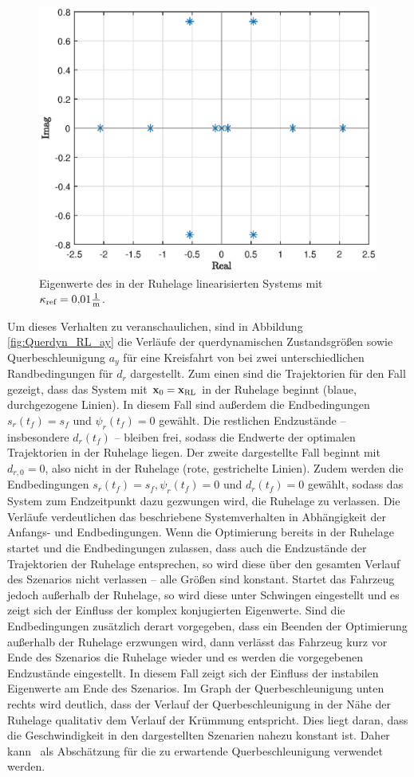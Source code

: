 \begin{figure}[h] 
	\centering
	\includegraphics[width=0.7\linewidth]{./Bilder/Ergebnisse/Kreisfahrt/Mit_Querdynamik/EW_linear_Kreisfahrt.eps}
	\caption{Eigenwerte des in der Ruhelage linearisierten Systems mit $\kappa_{\textrm{ref}} = 0{,}01\frac{1}{\mathrm{m}}$.}
	\label{fig:EW_linear_Kreisfahrt}
\end{figure} 
Um dieses Verhalten zu veranschaulichen, sind in Abbildung \ref{fig:Querdyn_RL_ay} die Verläufe der querdynamischen Zustandsgrößen sowie Querbeschleunigung $a_y$ für eine Kreisfahrt von  bei zwei unterschiedlichen Randbedingungen für $d_r$ dargestellt. Zum einen sind die Trajektorien für den Fall gezeigt, dass das System mit $\boldsymbol{\mathrm{x}}_0 = \boldsymbol{\mathrm{x}}_{\textrm{RL}}$ in der Ruhelage beginnt (blaue, durchgezogene Linien). In diesem Fall sind außerdem die Endbedingungen $s_r(t_f) = s_f$ und $\psi_r(t_f) = 0$ gewählt. Die restlichen Endzustände -- insbesondere $d_r(t_f)$ -- bleiben frei, sodass die Endwerte der optimalen Trajektorien in der Ruhelage liegen. Der zweite dargestellte Fall beginnt mit $d_{r,0} = 0$, also nicht in der Ruhelage (rote, gestrichelte Linien). Zudem werden die Endbedingungen $s_r(t_f) = s_f, \psi_r(t_f) = 0$ und $d_r(t_f) = 0$ gewählt, sodass das System zum Endzeitpunkt dazu gezwungen wird, die Ruhelage zu verlassen. Die Verläufe verdeutlichen das beschriebene Systemverhalten in Abhängigkeit der Anfangs- und Endbedingungen. Wenn die Optimierung bereits in der Ruhelage startet und die Endbedingungen zulassen, dass auch die Endzustände der Trajektorien der Ruhelage entsprechen, so wird diese über den gesamten Verlauf des Szenarios nicht verlassen --  alle Größen sind konstant. Startet das Fahrzeug jedoch außerhalb der Ruhelage, so wird diese unter Schwingen eingestellt und es zeigt sich der Einfluss der komplex konjugierten Eigenwerte. Sind die Endbedingungen zusätzlich derart vorgegeben, dass ein Beenden der Optimierung außerhalb der Ruhelage erzwungen wird, dann verlässt das Fahrzeug kurz vor Ende des Szenarios die Ruhelage wieder und es werden die vorgegebenen Endzustände eingestellt. In diesem Fall zeigt sich der Einfluss der instabilen Eigenwerte am Ende des Szenarios. Im Graph der Querbeschleunigung unten rechts wird deutlich, dass der Verlauf der Querbeschleunigung in der Nähe der Ruhelage qualitativ dem Verlauf der Krümmung entspricht. Dies liegt daran, dass die Geschwindigkeit in den dargestellten Szenarien nahezu konstant ist. Daher kann \ayRL~als Abschätzung für die zu erwartende Querbeschleunigung verwendet werden. 
